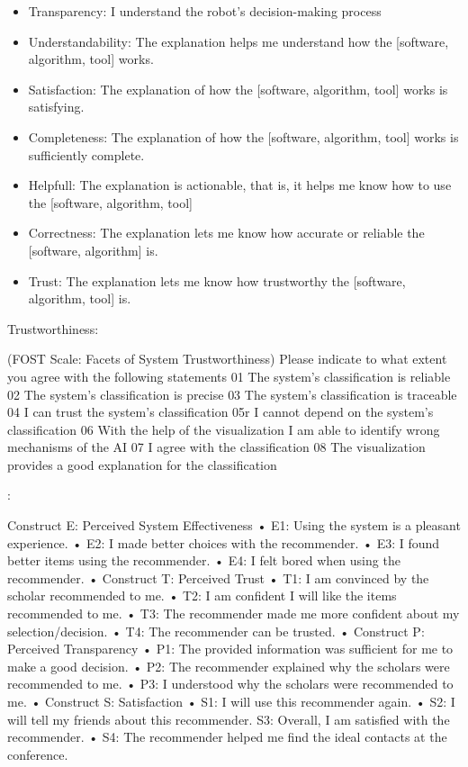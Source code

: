 \begin{itemize}
 \item Transparency: I understand the robot’s decision-making process \cite{wang_is_2018}
 \item Understandability: The explanation helps me understand how the [software, algorithm, tool] works. \cite{hoffman_metrics_nodate}
 \item Satisfaction: The explanation of how the [software, algorithm, tool] works is satisfying. \cite{hoffman_metrics_nodate}
 \item Completeness: The explanation of how the [software, algorithm, tool] works is sufficiently complete. \cite{hoffman_metrics_nodate}
 \item Helpfull: The explanation is actionable, that is, it helps me know how to use the [software, algorithm, tool] \cite{hoffman_metrics_nodate}
 \item Correctness: The explanation lets me know how accurate or reliable the [software, algorithm] is.\cite{hoffman_metrics_nodate}
 \item Trust: The explanation lets me know how trustworthy the [software, algorithm, tool] is. \cite{hoffman_metrics_nodate}
\end{itemize}

Trustworthiness: \cite{schrills_color_2020}

(FOST Scale: Facets of System Trustworthiness)
Please indicate to what extent you agree with the following statements 01 The system’s classification is reliable 02 The system’s classification is precise 03 The system’s classification is traceable 04 I can trust the system’s classification 05r I cannot depend on the system’s classification 06 With the help of the visualization I am able to identify wrong mechanisms of the AI 07 I agree with the classification 08 The visualization provides a good explanation for the classification


\cite{tsai_effects_2020}:

Construct E: Perceived System Effectiveness • E1: Using the system is a pleasant experience. • E2: I made better choices with the recommender. • E3: I found better items using the recommender. • E4: I felt bored when using the recommender. • Construct T: Perceived Trust • T1: I am convinced by the scholar recommended to me. • T2: I am confident I will like the items recommended to me. • T3: The recommender made me more confident about my selection/decision. • T4: The recommender can be trusted. • Construct P: Perceived Transparency • P1: The provided information was sufficient for me to make a good decision. • P2: The recommender explained why the scholars were recommended to me. • P3: I understood why the scholars were recommended to me. • Construct S: Satisfaction • S1: I will use this recommender again. • S2: I will tell my friends about this recommender. S3: Overall, I am satisfied with the recommender. • S4: The recommender helped me find the ideal contacts at the conference.

